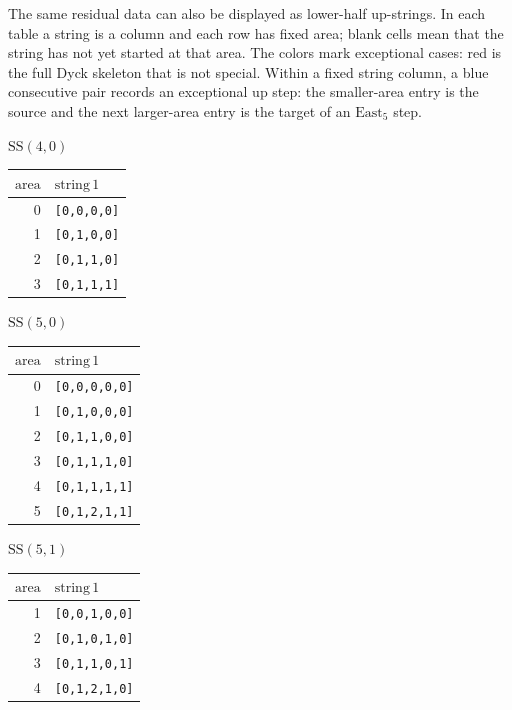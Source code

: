 \documentclass[11pt]{article}
\theoremstyle{plain}
\theoremstyle{definition}
\theoremstyle{remark}
\newcommand{\area}{\mathrm{area}}
\begin{document}
The same residual data can also be displayed as lower-half
\(\mathrm{up}\)-strings.  In each table a string is a column and
each row has fixed area; blank cells mean that the string has not yet
started at that area.  The colors mark exceptional cases: red is the full Dyck
skeleton that is not special.  Within a fixed string column, a blue consecutive
pair records an exceptional \(\mathrm{up}\) step: the smaller-area entry is the
source and the next larger-area entry is the target of an \(\mathrm{East}_5\)
step.
\begingroup
\scriptsize
\newcommand{\dseq}[1]{\texttt{[#1]}}
\newcommand{\rseq}[1]{\textcolor{red}{\dseq{#1}}}
\newcommand{\bseq}[1]{\textcolor{blue}{\dseq{#1}}}
\setlength{\tabcolsep}{1.5pt}
\par\medskip
\noindent\textbf{$\mathrm{SS}(4,0)$}
\\[2pt]
{\scriptsize%
\setlength{\tabcolsep}{1.5pt}%
\begin{tabular}{r|l}
\multicolumn{1}{r|}{\(\area\)} & $\mathrm{string}\,1$\\
\hline
0 & \dseq{0,0,0,0}\\
1 & \dseq{0,1,0,0}\\
2 & \dseq{0,1,1,0}\\
3 & \dseq{0,1,1,1}\\
\end{tabular}%
}
\par\medskip
\noindent\textbf{$\mathrm{SS}(5,0)$}
\\[2pt]
{\scriptsize%
\setlength{\tabcolsep}{1.5pt}%
\begin{tabular}{r|l}
\multicolumn{1}{r|}{\(\area\)} & $\mathrm{string}\,1$\\
\hline
0 & \dseq{0,0,0,0,0}\\
1 & \dseq{0,1,0,0,0}\\
2 & \dseq{0,1,1,0,0}\\
3 & \dseq{0,1,1,1,0}\\
4 & \dseq{0,1,1,1,1}\\
5 & \dseq{0,1,2,1,1}\\
\end{tabular}%
}
\par\medskip
\noindent\textbf{$\mathrm{SS}(5,1)$}
\\[2pt]
{\scriptsize%
\setlength{\tabcolsep}{1.5pt}%
\begin{tabular}{r|l}
\multicolumn{1}{r|}{\(\area\)} & $\mathrm{string}\,1$\\
\hline
1 & \dseq{0,0,1,0,0}\\
2 & \dseq{0,1,0,1,0}\\
3 & \dseq{0,1,1,0,1}\\
4 & \dseq{0,1,2,1,0}\\
\end{tabular}%
}
\end{document}
